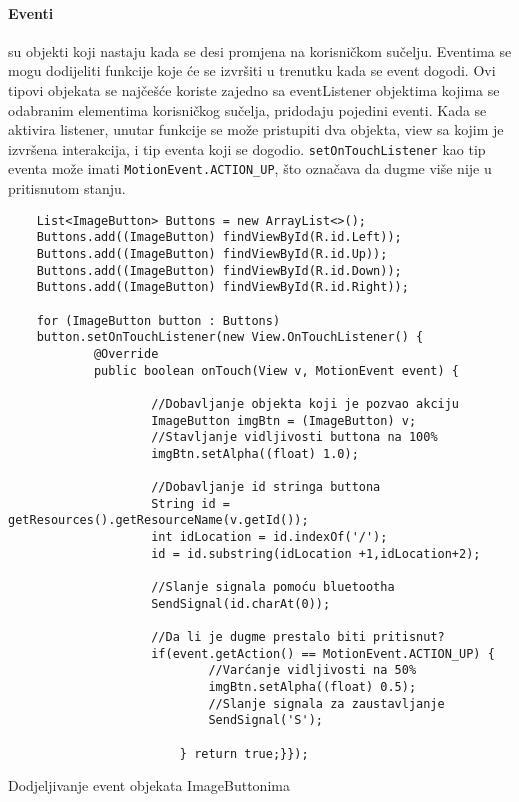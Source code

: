 \documentclass[../Document.tex]{subfiles}
\begin{document}
\paragraph{Eventi}  su objekti koji nastaju kada se desi promjena na korisničkom sučelju. Eventima se mogu dodijeliti funkcije koje će se izvršiti u trenutku kada se event dogodi. Ovi tipovi objekata se najčešće koriste zajedno sa eventListener objektima kojima se odabranim elementima korisničkog sučelja, pridodaju pojedini eventi. Kada se aktivira listener, unutar funkcije se može pristupiti dva objekta, view sa kojim je izvršena interakcija, i tip eventa koji se dogodio. \verb|setOnTouchListener| kao tip eventa može imati \verb|MotionEvent.ACTION_UP|, što označava da dugme više nije u pritisnutom stanju.

\begin{code}
    \begin{verbatim}
    List<ImageButton> Buttons = new ArrayList<>();
    Buttons.add((ImageButton) findViewById(R.id.Left));
    Buttons.add((ImageButton) findViewById(R.id.Up));
    Buttons.add((ImageButton) findViewById(R.id.Down));
    Buttons.add((ImageButton) findViewById(R.id.Right));

    for (ImageButton button : Buttons)
    button.setOnTouchListener(new View.OnTouchListener() {
            @Override
            public boolean onTouch(View v, MotionEvent event) {

                    //Dobavljanje objekta koji je pozvao akciju
                    ImageButton imgBtn = (ImageButton) v;
                    //Stavljanje vidljivosti buttona na 100%
                    imgBtn.setAlpha((float) 1.0);

                    //Dobavljanje id stringa buttona
                    String id = getResources().getResourceName(v.getId());
                    int idLocation = id.indexOf('/');
                    id = id.substring(idLocation +1,idLocation+2);

                    //Slanje signala pomoću bluetootha
                    SendSignal(id.charAt(0));

                    //Da li je dugme prestalo biti pritisnut?
                    if(event.getAction() == MotionEvent.ACTION_UP) {
                            //Varćanje vidljivosti na 50%
                            imgBtn.setAlpha((float) 0.5);
                            //Slanje signala za zaustavljanje
                            SendSignal('S');

                        } return true;}});
    \end{verbatim}
    \caption{Dodjeljivanje event objekata ImageButtonima}
\end{code}
\end{document}

